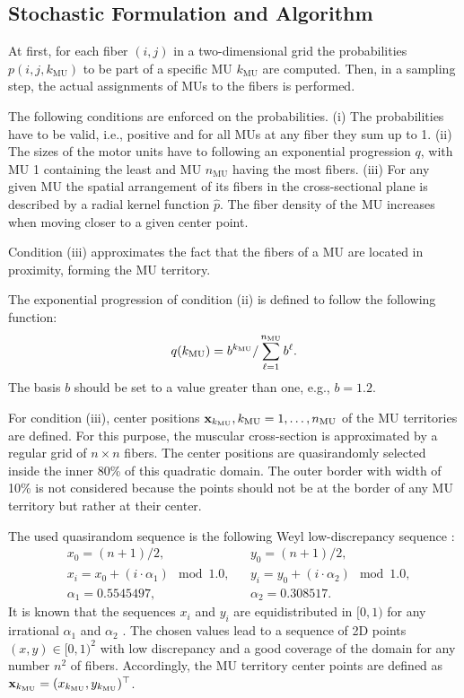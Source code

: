 \subsection{Stochastic Formulation and Algorithm}\label{sec:stochastic_formulation_and_algorithm}

At first, for each fiber ${(i,j)}$ in a two-dimensional grid the probabilities $p(i,j,k_\text{MU})$ to be part of a specific MU $k_\text{MU}$ are computed. Then, in a sampling step, the actual assignments of MUs to the fibers is performed.

The following conditions are enforced on the probabilities. (i) The probabilities have to be valid, i.e., positive and for all MUs at any fiber they sum up to 1. (ii) The sizes of the motor units have to following an exponential progression $q$, with  MU 1 containing the least and MU $n_\text{MU}$ having the most fibers. (iii) For any given MU the spatial arrangement of its fibers in the cross-sectional plane is described by a radial kernel function $\hat{p}$. The fiber density of the MU increases when moving closer to a given center point.

Condition (iii) approximates the fact that the fibers of a MU are located in proximity, forming the MU territory.

The exponential progression of condition (ii) is defined to follow the following function:
%
\begin{align}\label{eq:mus_q}
  q(k_\text{MU}) = b^{k_\text{MU}} / \displaystyle\sum\limits_{\ell=1}^{n_\text{MU}} b^\ell.
\end{align}
%
%
% 
The basis $b$ should be set to a value greater than one, e.g., $b=\num{1.2}$.

For condition (iii), center positions $\textbf{x}_{k_\text{MU}}, k_\text{MU}=1, \dots, n_\text{MU}$ of the MU territories are defined. 
For this purpose, the muscular cross-section is approximated by a regular grid of $n \times n$ fibers. The center positions are quasirandomly selected inside the inner 80\% of this quadratic domain. The outer border with width of 10\% is not considered because the points should not be at the border of any MU territory but rather at their center.

The used quasirandom sequence is the following Weyl low-discrepancy sequence \cite{Weyl1916}:
\begin{align*}
  &x_0 = (n+1)/2, \quad &&y_0 = (n+1)/2,\\[4mm]
  &x_{i} = x_0+(i\cdot \alpha_1) \mod \num{1.0},
  &&y_{i} = y_0+(i\cdot \alpha_2) \mod \num{1.0},\\[4mm]
  &\alpha_1 = \num{0.5545497}, \quad &&\alpha_2 = \num{0.308517}.
\end{align*}
It is known that the sequences $x_i$ and $y_i$ are equidistributed in $[0,1)$ for any irrational $\alpha_1$ and $\alpha_2$ \cite{Weyl1916}. The chosen values lead to a sequence of 2D points $(x,y)\in $$[0,1)^2$ with low discrepancy and a good coverage of the domain for any number $n^2$ of fibers. Accordingly, the MU territory center points are defined as $\textbf{x}_{k_\text{MU}} = (x_{k_\text{MU}}, y_{k_\text{MU}})^\top$.

